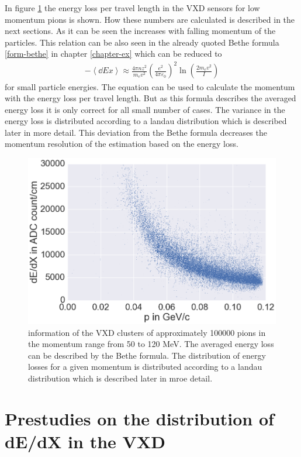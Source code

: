 In figure \ref{fig-dedx-over-p} the energy loss per travel length in the VXD sensors for low momentum pions is shown. How these numbers are calculated is described in the next sections. As it can be seen the \dedx increases with falling momentum of the particles. This relation can be also seen in the already quoted Bethe formula \ref{form-bethe} in chapter \ref{chapter-ex} which can be reduced to 
\begin{align*}
 -\left \langle \dd{E}{x} \right\rangle \approx \frac{4 \pi n z^2}{m_e v^2} \left( \frac{e^2}{4 \pi \varepsilon_0} \right)^2 \ln \left( \frac{2 m_e v^2}{I} \right)
\end{align*} 
for small particle energies. The equation can be used to calculate the momentum with the energy loss per travel length. But as this formula describes the averaged energy loss it is only correct for all small number of cases. The variance in the energy loss is distributed according to a landau distribution which is described later in more detail. This deviation from the Bethe formula decreases the momentum resolution of the estimation based on the energy loss.

\begin{figure}
 \centering
 \includegraphics[width=0.8\linewidth]{figures/vxd/dedx.png}
 \caption{\dedx information of the VXD clusters of approximately 100000 pions in the momentum range from 50 to 120 MeV. The averaged energy loss can be described by the Bethe formula. The distribution of energy losses for a given momentum is distributed according to a landau distribution which is described later in mroe detail.}
 \label{fig-dedx-over-p}
\end{figure}


\section{Prestudies on the distribution of dE/dX in the VXD}


